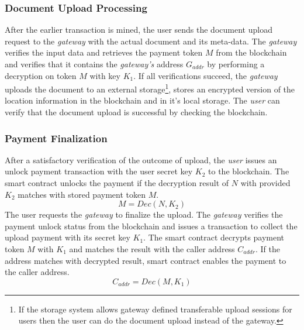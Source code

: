 \subsubsection{Document Upload Processing}
After the earlier transaction is mined, the user sends the document upload request to the {\it gateway} with the actual document and its meta-data. The {\it gateway} verifies the input data and retrieves the payment token $M$ from the blockchain and verifies that it contains the {\it gateway's} address $G_{addr}$ by performing a decryption on token $M$ with key $K_1$. If all verifications succeed, the {\it gateway} uploads the document to an external storage\footnote{If the storage system allows gateway defined transferable upload sessions for users then the user can do the document upload instead of the gateway.}, stores an encrypted version of the location information in the blockchain and in it's local storage. The {\it user} can verify that the document  upload is successful by checking the blockchain.

\subsubsection{Payment Finalization}
After a satisfactory verification of the outcome of upload, the {\it user} issues an unlock payment transaction with the user secret key $K_2$ to the blockchain. The smart contract unlocks the payment if the decryption result of $N$ with provided $K_2$ matches with stored payment token $M$.
\begin{equation}
\label{eq-u-3}
M = Dec (N, K_2)
\end{equation}
The user requests the {\it gateway} to finalize the upload. The {\it gateway} verifies the payment unlock status from the blockchain and issues a transaction to collect the upload payment with its secret key $K_1$. The smart contract decrypts payment token $M$ with $K_1$ and matches the result with the caller address $C_{addr}$. If the address matches with decrypted result, smart contract enables the payment to the caller address.
\begin{equation}
\label{eq-u-4}
C_{addr} = Dec (M, K_1)
\end{equation}

